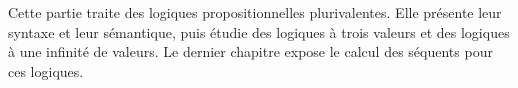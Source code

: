 \documentclass[../../include/open-logic-part]{subfiles}
\begin{document}
\begin{OLPartNotice}{}
Cette partie traite des logiques propositionnelles plurivalentes.
Elle présente leur syntaxe et leur sémantique, puis étudie des logiques
à trois valeurs et des logiques à une infinité de valeurs. Le dernier
chapitre expose le calcul des séquents pour ces logiques.
\end{OLPartNotice}





\OLEndPartHook
\end{document}
